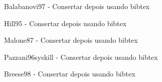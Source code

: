 \begin{thebibliography}{99}
   Balabanovi97 - Consertar depois usando bibtex

   Hill95 - Consertar depois usando bibtex

   Malone87 - Consertar depois usando bibtex

   Pazzani96syskill - Consertar depois usando bibtex

   Breese98 - Consertar depois usando bibtex


\end{thebibliography}
